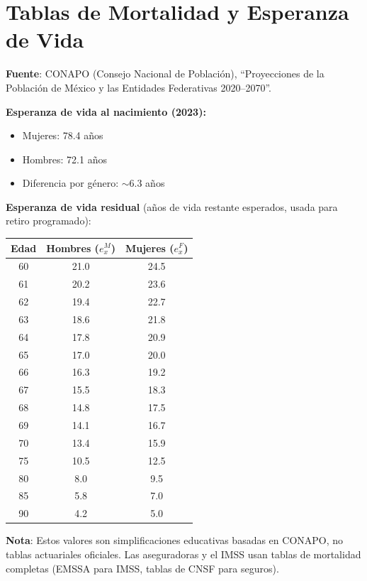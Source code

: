 \documentclass[11pt,a4paper]{report}
\begin{document}
\section{Tablas de Mortalidad y Esperanza de Vida}

\begin{tcolorbox}[colback=blue!5!white, colframe=blue!75!black, title=\textbf{Definici\'on Formal}]
\textbf{Fuente}: CONAPO (Consejo Nacional de Poblaci\'on), ``Proyecciones de la Poblaci\'on de M\'exico y las Entidades Federativas 2020--2070''.

\textbf{Esperanza de vida al nacimiento (2023):}
\begin{itemize}[nosep]
\item Mujeres: 78.4 a\~nos
\item Hombres: 72.1 a\~nos
\item Diferencia por g\'enero: $\sim$6.3 a\~nos
\end{itemize}

\textbf{Esperanza de vida residual} (a\~nos de vida restante esperados, usada para retiro programado):

\begin{center}
\begin{tabular}{ccc}
\toprule
\textbf{Edad} & \textbf{Hombres ($e_x^M$)} & \textbf{Mujeres ($e_x^F$)} \\
\midrule
60 & 21.0 & 24.5 \\
61 & 20.2 & 23.6 \\
62 & 19.4 & 22.7 \\
63 & 18.6 & 21.8 \\
64 & 17.8 & 20.9 \\
65 & 17.0 & 20.0 \\
66 & 16.3 & 19.2 \\
67 & 15.5 & 18.3 \\
68 & 14.8 & 17.5 \\
69 & 14.1 & 16.7 \\
70 & 13.4 & 15.9 \\
75 & 10.5 & 12.5 \\
80 & 8.0 & 9.5 \\
85 & 5.8 & 7.0 \\
90 & 4.2 & 5.0 \\
\bottomrule
\end{tabular}
\end{center}

\textbf{Nota}: Estos valores son simplificaciones educativas basadas en CONAPO, no tablas actuariales oficiales. Las aseguradoras y el IMSS usan tablas de mortalidad completas (EMSSA para IMSS, tablas de CNSF para seguros).
\end{tcolorbox}
\end{document}
